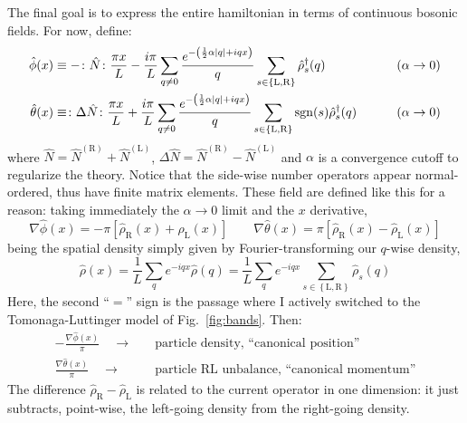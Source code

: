 The final goal is to express the entire hamiltonian in terms of continuous bosonic fields. For now, define:
\[
\begin{aligned}
	\hat \phi(x) &\equiv - \colon \hat N \colon \frac{\pi x}{L} - \frac{i\pi}{L} \sum_{q \neq 0} \frac{e^{-\left( \frac{1}{2} \alpha \abs{q} + iqx \right)}}{q} \sum_{s \in \left\{\mathrm L, \mathrm R\right\}} \hat \rho_s^\dagger (q) &&\qquad\left( \alpha \to 0 \right) \\
	\hat \theta(x) &\equiv \colon \Delta \hat N \colon \frac{\pi x}{L} + \frac{i\pi}{L} \sum_{q \neq 0} \frac{e^{-\left( \frac{1}{2} \alpha \abs{q} + iqx \right)}}{q} \sum_{s \in \left\{\mathrm L, \mathrm R\right\}} \mathrm{sgn}(s) \hat \rho_s^\dagger (q) &&\qquad\left( \alpha \to 0 \right)
\end{aligned}
\]
where $\hat N = \hat N^{(\mathrm R)} + \hat N^{(\mathrm L)}$, $\Delta \hat N = \hat N^{(\mathrm R)} - \hat N^{(\mathrm L)}$ and $\alpha$ is a convergence cutoff to regularize the theory. Notice that the side-wise number operators appear normal-ordered, thus have finite matrix elements.
These field are defined like this for a reason: taking immediately the $\alpha \to 0$ limit and the $x$ derivative,
\begin{equation}\label{eq:fields-density-equations}
	\nabla \hat \phi(x) = - \pi \left[ \hat \rho_\mathrm{R}(x) + \hat \rho_\mathrm{L}(x) \right]
	\qquad
	\nabla \hat \theta(x) = \pi \left[ \hat \rho_\mathrm{R}(x) - \hat \rho_\mathrm{L}(x) \right]
\end{equation}
being the spatial density simply given by Fourier-transforming our $q$-wise density,
\[
	\hat \rho(x) = \frac{1}{L} \sum_q e^{-iqx} \hat \rho(q) = \frac{1}{L} \sum_q e^{-iqx} \sum_{s \in \left\{\mathrm L, \mathrm R\right\}} \hat \rho_s(q)
\]
Here, the second ``$=$'' sign is the passage where I actively switched to the Tomonaga-Luttinger model of Fig.~\ref{fig:bands}.
Then:
\[
\begin{aligned}
	- \frac{\nabla \hat \phi(x)}{\pi} \quad\to\quad &\text{particle density, ``canonical position''}\\
	\frac{\nabla \hat \theta(x)}{\pi} \quad\to\quad &\text{particle $\mathrm{RL}$ unbalance, ``canonical momentum''}
\end{aligned}
\]
The difference $\hat \rho_\mathrm{R} - \hat \rho_\mathrm{L}$ is related to the current operator in one dimension: it just subtracts, point-wise, the left-going density from the right-going density.

